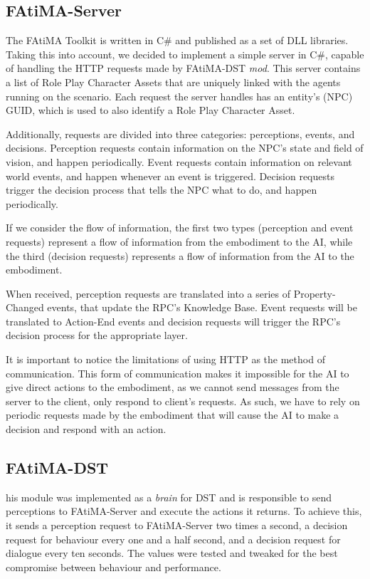 \subsection{FAtiMA-Server}

The FAtiMA Toolkit is written in C\# and published as a set of DLL libraries.
Taking this into account, we decided to implement a simple server in C\#, capable of handling the HTTP requests made by FAtiMA-DST \textit{mod}.
This server contains a list of Role Play Character Assets that are uniquely linked with the agents running on the scenario.
Each request the server handles has an entity's (NPC) GUID, which is used to also identify a Role Play Character Asset.

Additionally, requests are divided into three categories: perceptions, events, and decisions.
Perception requests contain information on the NPC's state and field of vision, and happen periodically.
Event requests contain information on relevant world events, and happen whenever an event is triggered.
Decision requests trigger the decision process that tells the NPC what to do, and happen periodically.

If we consider the flow of information, the first two types (perception and event requests) represent a flow of information from the embodiment to the AI, while the third (decision requests) represents a flow of information from the AI to the embodiment.

When received, perception requests are translated into a series of Property-Changed events, that update the RPC's Knowledge Base.
Event requests will be translated to Action-End events and decision requests will trigger the RPC's decision process for the appropriate layer.

It is important to notice the limitations of using HTTP as the method of communication.
This form of communication makes it impossible for the AI to give direct actions to the embodiment, as we cannot send messages from the server to the client, only respond to client's requests.
As such, we have to rely on periodic requests made by the embodiment that will cause the AI to make a decision and respond with an action.

\subsection{FAtiMA-DST}

his module was implemented as a \textit{brain} for DST and is responsible to send perceptions to FAtiMA-Server and execute the actions it returns.
To achieve this, it sends a perception request to FAtiMA-Server two times a second, a decision request for behaviour every one and a half second, and a decision request for dialogue every ten seconds.
The values were tested and tweaked for the best compromise between behaviour and performance.

